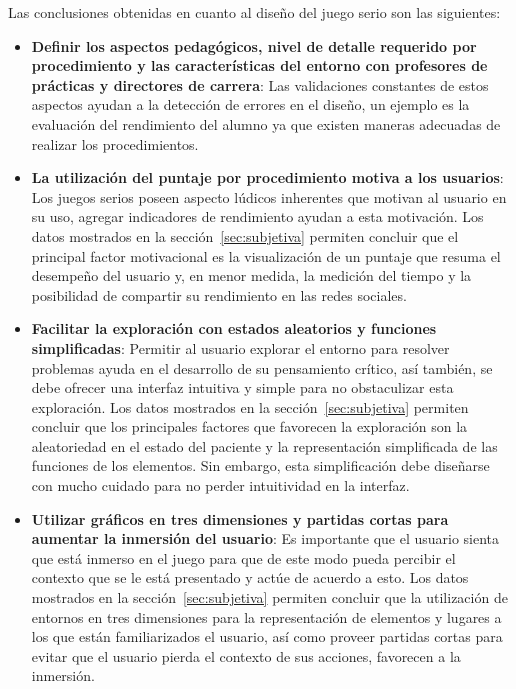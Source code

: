 Las conclusiones obtenidas en cuanto al diseño del juego serio son las siguientes:

\begin{itemize}


\item \textbf{Definir los aspectos pedagógicos, nivel de detalle requerido por
        procedimiento y las características del entorno con profesores de
        prácticas y directores de carrera}:
    Las validaciones constantes de estos aspectos ayudan a la detección de
    errores en el diseño, un ejemplo es la evaluación del rendimiento del alumno
    ya que existen maneras adecuadas de realizar los procedimientos.

\item \textbf{La utilización del puntaje por procedimiento motiva a los
        usuarios}: Los juegos serios poseen aspecto lúdicos inherentes que
    motivan al usuario en su uso, agregar indicadores de rendimiento ayudan a
    esta motivación. Los datos mostrados en la sección~\ref{sec:subjetiva}
    permiten concluir que el principal factor motivacional es la visualización
    de un puntaje que resuma el desempeño del usuario y, en menor medida, la
    medición del tiempo y la posibilidad de compartir su rendimiento en las
    redes sociales. 

\item \textbf{Facilitar la exploración con estados aleatorios y funciones
        simplificadas}: Permitir al usuario explorar el entorno para resolver
    problemas ayuda en el desarrollo de su pensamiento crítico, así también, se
    debe ofrecer una interfaz intuitiva y simple para no obstaculizar esta
    exploración. Los datos mostrados en la sección~\ref{sec:subjetiva} permiten
    concluir que los principales factores que favorecen la exploración son la
    aleatoriedad en el estado del paciente y la representación simplificada de
    las funciones de los elementos. Sin embargo, esta simplificación debe
    diseñarse con mucho cuidado para no perder intuitividad en la interfaz. 

\item \textbf{Utilizar gráficos en tres dimensiones y partidas cortas para
        aumentar la inmersión del usuario}: Es importante que el usuario sienta
    que está inmerso en el juego para que de este modo pueda percibir el
    contexto que se le está presentado y actúe de acuerdo a esto. Los datos
    mostrados en la sección~\ref{sec:subjetiva} permiten concluir que la
    utilización de entornos en tres dimensiones para la representación de
    elementos y lugares a los que están familiarizados el usuario, así como
    proveer partidas cortas para evitar que el usuario pierda el contexto de sus
    acciones, favorecen a la inmersión. 


\end{itemize}

